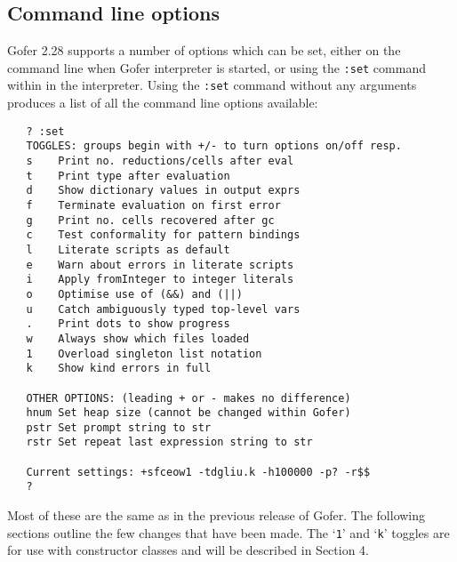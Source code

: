 \subsection{Command line options}
Gofer 2.28 supports a number of options which can be set, either on the
command line when Gofer interpreter is started, or using the \verb":set"
command within in the interpreter.  Using the \verb":set" command without any
arguments produces a list of all the command line options available:
\begin{verbatim}
   ? :set
   TOGGLES: groups begin with +/- to turn options on/off resp.
   s    Print no. reductions/cells after eval
   t    Print type after evaluation
   d    Show dictionary values in output exprs
   f    Terminate evaluation on first error
   g    Print no. cells recovered after gc
   c    Test conformality for pattern bindings
   l    Literate scripts as default
   e    Warn about errors in literate scripts
   i    Apply fromInteger to integer literals
   o    Optimise use of (&&) and (||)
   u    Catch ambiguously typed top-level vars
   .    Print dots to show progress
   w    Always show which files loaded
   1    Overload singleton list notation
   k    Show kind errors in full

   OTHER OPTIONS: (leading + or - makes no difference)
   hnum Set heap size (cannot be changed within Gofer)
   pstr Set prompt string to str
   rstr Set repeat last expression string to str

   Current settings: +sfceow1 -tdgliu.k -h100000 -p? -r$$
   ?
\end{verbatim}
Most of these are the same as in the previous release of Gofer.  The
following sections outline the few changes that have been made.  The
`\verb"1"' and `\verb"k"' toggles are for use with constructor classes and will be
described in Section 4.


